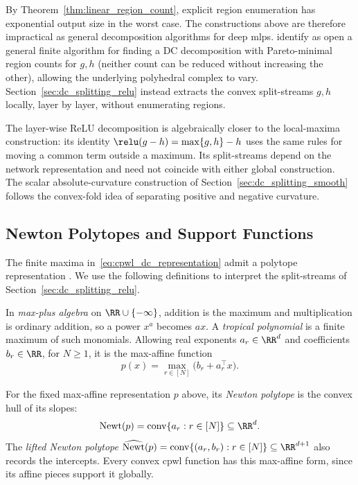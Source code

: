 \begin{remark}\label{rem:linear_regions}
By Theorem~\ref{thm:linear_region_count}, explicit region enumeration has exponential output size in the worst case. The constructions above are therefore impractical as general decomposition algorithms for deep \acp{mlp}. \textcite[Section~4]{Brandenburg2025_DecompositionPolyhedra} identify as open a general finite algorithm for finding a DC decomposition with Pareto-minimal region counts for $g,h$ (neither count can be reduced without increasing the other), allowing the underlying polyhedral complex to vary. Section~\ref{sec:dc_splitting_relu} instead extracts the convex split-streams $g,h$ locally, layer by layer, without enumerating regions.

The layer-wise ReLU decomposition is algebraically closer to the local-maxima construction: its identity $\relu(g-h)=\max\{g,h\}-h$ uses the same rules for moving a common term outside a maximum. Its split-streams depend on the network representation and need not coincide with either global construction. The scalar absolute-curvature construction of Section~\ref{sec:dc_splitting_smooth} follows the convex-fold idea of separating positive and negative curvature.
\end{remark}

\subsection{Newton Polytopes and Support Functions}\label{sec:polytope_foundations}

The finite maxima in~\eqref{eq:cpwl_dc_representation} admit a polytope representation \parencite{Ziegler1995,Zhang2018}. We use the following definitions to interpret the split-streams of Section~\ref{sec:dc_splitting_relu}.

In \emph{max-plus algebra} on $\RR\cup\{-\infty\}$, addition is the maximum and multiplication is ordinary addition, so a power $x^a$ becomes $ax$. A \emph{tropical polynomial} is a finite maximum of such monomials. Allowing real exponents $a_r\in\RR^d$ and coefficients $b_r\in\RR$, for $N\ge1$, it is the max-affine function
\[
    p(x)=\max_{r\in[N]}\bigl(b_r+a_r^\top x\bigr).
\]

\begin{definition}\label{def:newton_polytope}
For the fixed max-affine representation $p$ above, its \emph{Newton polytope} is the convex hull of its slopes:
\begin{equation}
    \operatorname{Newt}(p)=\operatorname{conv}\{a_r:r\in[N]\}\subseteq\RR^d.
    \label{eq:newton_polytope}
\end{equation}
The \emph{lifted Newton polytope} $\widehat{\operatorname{Newt}}(p)=\operatorname{conv}\{(a_r,b_r):r\in[N]\}\subseteq\RR^{d+1}$ also records the intercepts. Every convex \ac{cpwl} function has this max-affine form, since its affine pieces support it globally.
\end{definition}

